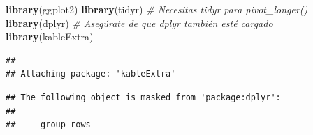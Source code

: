 \documentclass[
]{article}
\newenvironment{Shaded}{\begin{snugshade}}{\end{snugshade}}
\newcommand{\CommentTok}[1]{\textcolor[rgb]{0.56,0.35,0.01}{\textit{#1}}}
\newcommand{\FunctionTok}[1]{\textcolor[rgb]{0.13,0.29,0.53}{\textbf{#1}}}
\newcommand{\NormalTok}[1]{#1}
\begin{document}
\begin{Shaded}
\begin{Highlighting}[]
\FunctionTok{library}\NormalTok{(ggplot2)}
\FunctionTok{library}\NormalTok{(tidyr) }\CommentTok{\# Necesitas tidyr para pivot\_longer()}
\FunctionTok{library}\NormalTok{(dplyr) }\CommentTok{\# Asegúrate de que dplyr también esté cargado}
\FunctionTok{library}\NormalTok{(kableExtra)}
\end{Highlighting}
\end{Shaded}

\begin{verbatim}
## 
## Attaching package: 'kableExtra'
\end{verbatim}

\begin{verbatim}
## The following object is masked from 'package:dplyr':
## 
##     group_rows
\end{verbatim}
\end{document}
